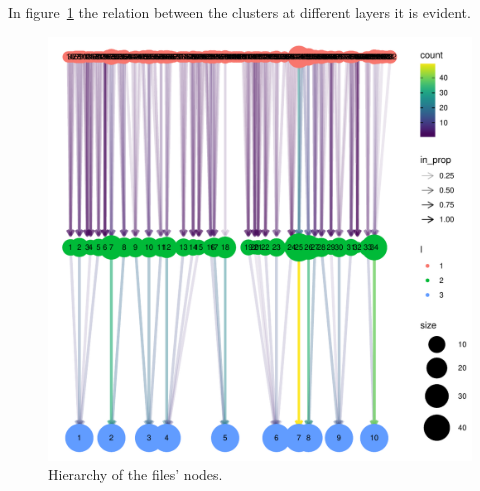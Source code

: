 In figure~\ref{fig:topic/gtex/oversigma_10tissue/bipartite_rebuild} the relation between the clusters at different layers it is evident.
\begin{figure}[htb!]
    \centering
    \includegraphics[width=0.8\linewidth]{pictures/topic/gtex/oversigma_10tissue/bipartite_rebuild.pdf}
    \caption{Hierarchy of the files' nodes.}
    \label{fig:topic/gtex/oversigma_10tissue/bipartite_rebuild}
\end{figure}

\clearpage

